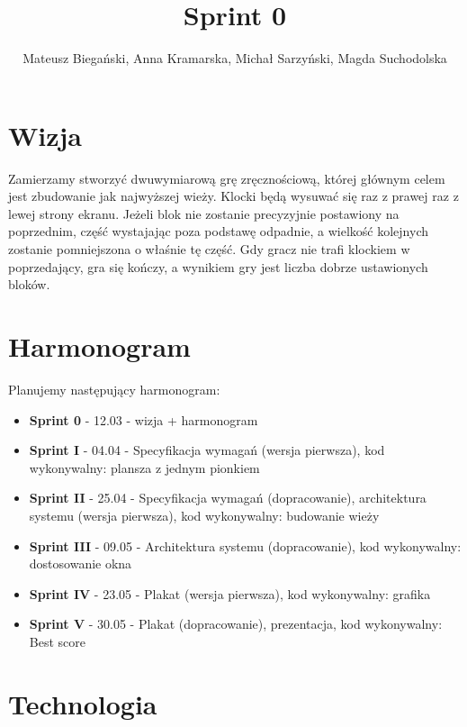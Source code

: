 \documentclass{article}
\begin{document}
\title{Sprint 0}

\author{Mateusz Biegański, Anna Kramarska, Michał Sarzyński, Magda Suchodolska}
\maketitle

\section{Wizja}

Zamierzamy stworzyć dwuwymiarową grę zręcznościową, której głównym celem jest zbudowanie jak najwyższej wieży.
Klocki będą wysuwać się raz z prawej raz z lewej strony ekranu.
Jeżeli blok nie zostanie precyzyjnie postawiony na poprzednim, część wystajając poza podstawę odpadnie, a wielkość kolejnych zostanie pomniejszona o właśnie tę część.
Gdy gracz nie trafi klockiem w poprzedający, gra się kończy, a wynikiem gry jest liczba dobrze ustawionych bloków.

\section{Harmonogram}
Planujemy następujący harmonogram:
\begin{itemize}
\item\textbf{Sprint 0} - 12.03 - wizja + harmonogram
\item\textbf{Sprint I} - 04.04 - Specyfikacja wymagań (wersja pierwsza), kod wykonywalny: plansza z jednym pionkiem
\item\textbf{Sprint II} - 25.04 - Specyfikacja wymagań (dopracowanie), architektura systemu (wersja pierwsza), kod wykonywalny: budowanie wieży
\item\textbf{Sprint III} - 09.05 - Architektura systemu (dopracowanie), kod wykonywalny: dostosowanie okna
\item\textbf{Sprint IV} - 23.05 - Plakat (wersja pierwsza), kod wykonywalny: grafika
\item\textbf{Sprint V} - 30.05 - Plakat (dopracowanie), prezentacja, kod wykonywalny: Best score
\end{itemize}
\section{Technologia}
\end{document}
